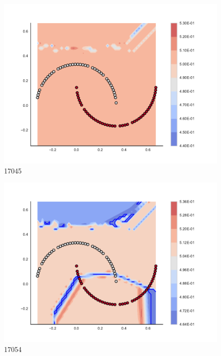 \begin{subfigure}[b]{0.09\textwidth}
    \includegraphics[clip, trim=2.35cm 1.75cm 4.5cm 0cm,width=\textwidth]{img/convergence/17045.pdf}
    \caption{17045}
    \label{fig:convergence_17045}
\end{subfigure}
%
\begin{subfigure}[b]{0.09\textwidth}
    \includegraphics[clip, trim=2.35cm 1.75cm 4.5cm 0cm,width=\textwidth]{img/convergence/17054.pdf}
    \caption{17054}
    \label{fig:convergence_17054}
\end{subfigure}
%
